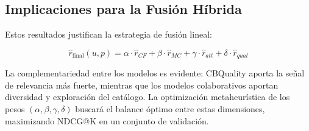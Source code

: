 \documentclass[11pt, a4paper]{article}
\begin{document}

\subsection{Implicaciones para la Fusión Híbrida}

Estos resultados justifican la estrategia de fusión lineal:

\begin{equation}
    \hat{r}_{\text{final}}(u,p) = \alpha \cdot \hat{r}_{CF} + \beta \cdot \hat{r}_{MC} + \gamma \cdot \hat{r}_{att} + \delta \cdot \hat{r}_{qual}
\end{equation}

La complementariedad entre los modelos es evidente: CBQuality aporta la señal de relevancia más fuerte, mientras que los modelos colaborativos aportan diversidad y exploración del catálogo. La optimización metaheurística de los pesos $(\alpha, \beta, \gamma, \delta)$ buscará el balance óptimo entre estas dimensiones, maximizando NDCG@K en un conjunto de validación.
\end{document}
